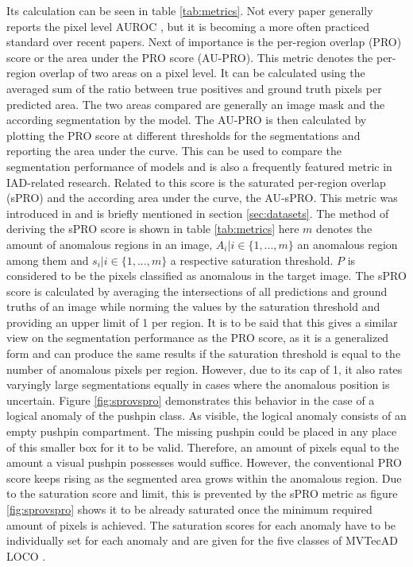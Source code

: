 

Its calculation can be seen in 
table \ref{tab:metrics}. Not every paper generally reports the pixel level AUROC \cite{csflow2022}, but it is becoming a more often 
practiced standard over recent papers.
Next of importance is the per-region overlap (PRO) score or the area under the PRO score (AU-PRO). This metric denotes the per-region overlap of two areas 
on a pixel level. It can be calculated using the averaged sum of the ratio between true positives and ground truth pixels per predicted area. The two areas 
compared are generally an image mask and the according segmentation by the model. The AU-PRO is then calculated by plotting the PRO score 
at different thresholds for the segmentations and reporting the area under the curve. This can be 
used to compare the segmentation performance of models and is also a frequently featured metric in IAD-related research. 
Related to this score is the saturated per-region overlap (sPRO) and the according area under the curve, the AU-sPRO. This metric was 
introduced in \cite{LOCODentsAndScratchesBergmann2022} and is briefly mentioned in section \ref{sec:datasets}. The method of deriving the sPRO 
score is shown in table \ref{tab:metrics} here $m$ denotes the amount of anomalous regions in an image, $A_i | i \in \{1, ... , m\}$ an anomalous 
region among them and $s_i | i \in \{1, ... , m\}$ a respective saturation threshold. $P$ is considered to be the pixels classified as anomalous 
in the target image. The sPRO score is calculated by averaging the intersections of all predictions and ground truths of an image 
while norming the values by the saturation threshold and providing an upper limit of 1 per region. It is to be said that this gives a similar 
view on the segmentation performance as the PRO score, as it is a generalized form and can produce the same results if the saturation 
threshold is equal to the number of anomalous pixels per region. However, due to its cap of 1, it also rates varyingly large segmentations equally in cases 
where the anomalous position is uncertain. Figure \ref{fig:sprovspro} demonstrates this behavior in the case of a logical anomaly of the pushpin class. 
As visible, the logical anomaly consists of an empty pushpin compartment. The missing pushpin could be placed in any place of this smaller 
box for it to be valid. Therefore, an amount of pixels equal to the amount a visual pushpin possesses would suffice. However, the conventional PRO score 
keeps rising as the segmented area grows within the anomalous region. Due to the saturation score and limit, this is prevented 
by the sPRO metric as figure \ref{fig:sprovspro} shows it to be already saturated once the minimum required amount of pixels is achieved. The saturation 
scores for each anomaly have to be individually set for each anomaly and are given for the five classes of MVTecAD LOCO \cite{LOCODentsAndScratchesBergmann2022}.

